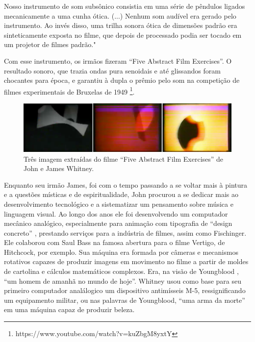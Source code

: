 \begin{citacao}
Nosso instrumento de som subsônico consistia em uma série de pêndulos ligados mecanicamente a uma cunha ótica. (...) Nenhum som audível era gerado pelo instrumento. Ao invés disso, uma trilha sonora ótica de dimensões padrão era sinteticamente exposta no filme, que depois de processado podia ser tocado em um projetor de filmes padrão."\cite[152]{Whitney1980} 
\end{citacao}

Com esse instrumento, os irmãos fizeram ``Five Abstract Film Exercises''. O resultado sonoro, que trazia ondas pura senoidais e até glissandos foram chocantes para época, e garantiu à dupla o prêmio pelo som na competição de filmes experimentais de Bruxelas de 1949 \footnote{https://www.youtube.com/watch?v=kuZbgM8yxtY}.

\begin{figure}[ht]
    \caption{\label{witney}Três imagem extraídas do filme ``Five Abstract Film Exercises'' de John e James Whitney.}
    \begin{center}
        \includegraphics[width=1\linewidth]{pictures/cap2/witney}
    \end{center}
\end{figure}

Enquanto seu irmão James, foi com o tempo passando a se voltar mais à pintura e a questões místicas e de espiritualidade, John procurou a se dedicar mais ao desenvolvimento tecnológico e a sistematizar um pensamento sobre música e linguagem visual. Ao longo dos anos ele foi desenvolvendo um computador mecânico analógico, especialmente para animação com tipografia de ``design concreto'' \cite{Youngblood1970}, prestando serviços para a indústria de filmes, assim como Fischinger. Ele colaborou com Saul Bass na famosa abertura para o filme Vertigo, de Hitchcock, por exemplo. Sua máquina era formada por câmeras e mecanismos rotativos capazes de produzir imagens em movimento no filme a partir de moldes de cartolina e cálculos matemáticos complexos. Era, na visão de Youngblood \cite{Youngblood1970}, ``um homem de amanhã no mundo de hoje''. Whitney usou como base para seu primeiro computador analálogico um dispositivo antimísseis M-5, ressignificando um equipamento militar, ou nas palavras de Youngblood, ``uma arma da morte'' em uma máquina capaz de produzir beleza.

